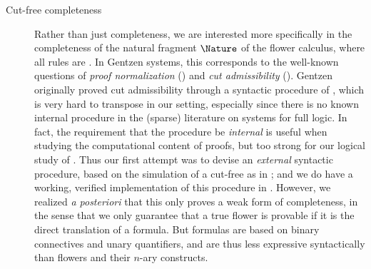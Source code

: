 \begin{scope}
\begin{description}
  \item[Cut-free completeness]
    Rather than just completeness, we are interested more specifically in the
    completeness of the natural fragment $\Nature$ of the flower calculus, where
    all rules are \emph{}. In Gentzen systems, this corresponds to
    the well-known questions of \emph{proof normalization} () and \emph{cut admissibility} (). Gentzen
    originally proved cut admissibility through a syntactic procedure of
    \emph{}, which is very hard to transpose in our  setting, especially since there is no known internal
     procedure in the (sparse) literature on  systems for full  logic. In fact, the
    requirement that the procedure be \emph{internal} is useful when studying
    the computational content of proofs, but too strong for our logical study of
    . Thus our first attempt was to devise an \emph{external}
    syntactic procedure, based on the simulation of a cut-free  as in ; and we do have a working,
    verified implementation of this procedure in 
    \cite{flowers-metatheory}. However, we realized \textit{a posteriori} that
    this only proves a weak form of completeness, in the sense that we only
    guarantee that a true flower is provable if it is the direct translation of
    a  formula. But formulas are based on binary connectives and
    unary quantifiers, and are thus less expressive syntactically than flowers
    and their $n$-ary constructs.


\end{description}
\end{scope}
